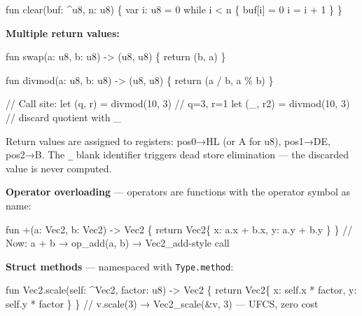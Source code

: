 \documentclass[
  11pt,
]{article}
\newenvironment{Shaded}{\begin{snugshade}}{\end{snugshade}}
\newcommand{\NormalTok}[1]{#1}
\begin{document}
\begin{Shaded}
\begin{Highlighting}[]
\NormalTok{fun clear(buf: \^{}u8, n: u8) \{}
\NormalTok{    var i: u8 = 0}
\NormalTok{    while i \textless{} n \{}
\NormalTok{        buf[i] = 0}
\NormalTok{        i = i + 1}
\NormalTok{    \}}
\NormalTok{\}}
\end{Highlighting}
\end{Shaded}

\textbf{Multiple return values:}

\begin{Shaded}
\begin{Highlighting}[]
\NormalTok{fun swap(a: u8, b: u8) {-}\textgreater{} (u8, u8) \{}
\NormalTok{    return (b, a)}
\NormalTok{\}}

\NormalTok{fun divmod(a: u8, b: u8) {-}\textgreater{} (u8, u8) \{}
\NormalTok{    return (a / b, a \% b)}
\NormalTok{\}}

\NormalTok{// Call site:}
\NormalTok{let (q, r) = divmod(10, 3)    // q=3, r=1}
\NormalTok{let (\_, r2) = divmod(10, 3)   // discard quotient with \_}
\end{Highlighting}
\end{Shaded}

Return values are assigned to registers: pos0→HL (or A for u8), pos1→DE,
pos2→B. The \texttt{\_} blank identifier triggers dead store elimination
--- the discarded value is never computed.

\textbf{Operator overloading} --- operators are functions with the
operator symbol as name:

\begin{Shaded}
\begin{Highlighting}[]
\NormalTok{fun +(a: Vec2, b: Vec2) {-}\textgreater{} Vec2 \{}
\NormalTok{    return Vec2\{ x: a.x + b.x, y: a.y + b.y \}}
\NormalTok{\}}
\NormalTok{// Now: a + b → op\_add(a, b) → Vec2\_add{-}style call}
\end{Highlighting}
\end{Shaded}

\textbf{Struct methods} --- namespaced with \texttt{Type.method}:

\begin{Shaded}
\begin{Highlighting}[]
\NormalTok{fun Vec2.scale(self: \^{}Vec2, factor: u8) {-}\textgreater{} Vec2 \{}
\NormalTok{    return Vec2\{ x: self.x * factor, y: self.y * factor \}}
\NormalTok{\}}
\NormalTok{// v.scale(3) → Vec2\_scale(\&v, 3)  — UFCS, zero cost}
\end{Highlighting}
\end{Shaded}
\end{document}
